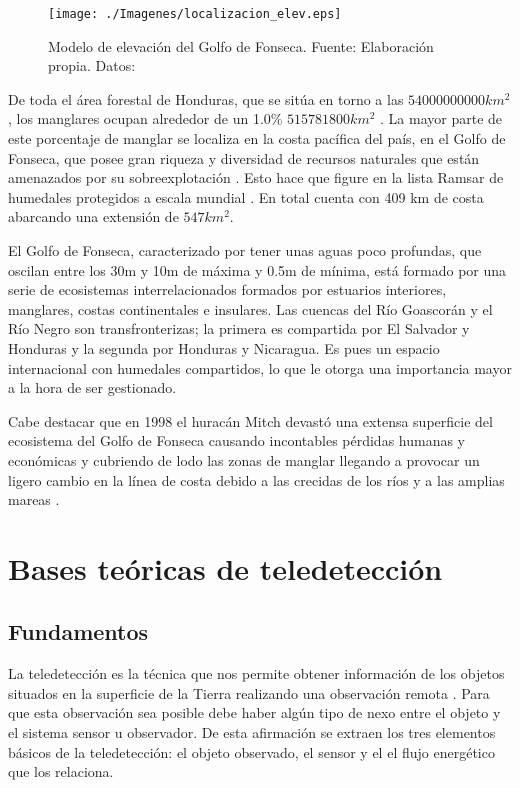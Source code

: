\begin{figure}
	\centering
	\texttt{[image: ./Imagenes/localizacion\_elev.eps]}
	\caption[Modelo de elevación del Golfo de Fonseca]{Modelo de elevación del Golfo de Fonseca. Fuente: Elaboración propia. Datos: \cite{SRTM2008}}
	\label{fig:elevacion}
\end{figure}

De toda el área forestal de Honduras, que se sitúa en torno a las $54000000000 km^{2}$, los manglares ocupan alrededor de un 1.0\% $515781800 km^{2}$ \citep{anuario2013}. La mayor parte de este porcentaje de manglar se localiza en la costa pacífica del país, en el Golfo de Fonseca, que posee gran riqueza y diversidad de recursos naturales que están amenazados por su sobreexplotación \citep{Jimenez1994}. Esto hace que figure en la lista Ramsar de humedales protegidos a escala mundial \citep{Ramsar2014}. En total cuenta con 409 km de costa abarcando una extensión de $547 km^{2}$.\Sep

El Golfo de Fonseca, caracterizado por tener unas aguas poco profundas, que oscilan entre los 30m y 10m de máxima y 0.5m de mínima, está formado por una serie de ecosistemas interrelacionados formados por estuarios interiores, manglares, costas continentales e insulares. Las cuencas del Río Goascorán y el Río Negro son transfronterizas; la primera es compartida por El Salvador y Honduras y la segunda por Honduras y Nicaragua. Es pues un espacio internacional con humedales compartidos, lo que le otorga una importancia mayor a la hora de ser gestionado.\Sep

Cabe destacar que en 1998 el huracán Mitch devastó una extensa superficie del ecosistema del Golfo de Fonseca causando incontables pérdidas humanas y económicas y cubriendo de lodo las zonas de manglar llegando a provocar un ligero cambio en la línea de costa debido a las crecidas de los ríos y a las amplias mareas \citep{mexico1999honduras}.

\section{Bases teóricas de teledetección} \label{sec:bases}
\subsection{Fundamentos} \label{subsec:fundamentos}
La teledetección es la técnica que nos permite obtener información de los objetos situados en la superficie de la Tierra realizando una observación remota \citep{Curran1991Longman} \citep{chuvieco2002teledeteccion} \citep{schowengerdt2006}. Para que esta observación sea posible debe haber algún tipo de nexo entre el objeto y el sistema sensor u observador. De esta afirmación se extraen los tres elementos básicos de la teledetección: el objeto observado, el sensor y el el flujo energético que los relaciona.\Sep

